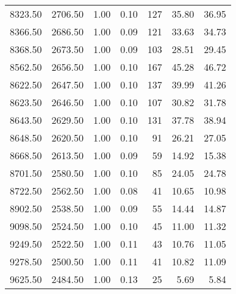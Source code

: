 \begin{table}
\begin{tabular}{rrrrrrr}
8323.50 & 2706.50 & 1.00 & 0.10 & 127 & 35.80 & 36.95 \\
8366.50 & 2686.50 & 1.00 & 0.09 & 121 & 33.63 & 34.73 \\
8368.50 & 2673.50 & 1.00 & 0.09 & 103 & 28.51 & 29.45 \\
8562.50 & 2656.50 & 1.00 & 0.10 & 167 & 45.28 & 46.72 \\
8622.50 & 2647.50 & 1.00 & 0.10 & 137 & 39.99 & 41.26 \\
8623.50 & 2646.50 & 1.00 & 0.10 & 107 & 30.82 & 31.78 \\
8643.50 & 2629.50 & 1.00 & 0.10 & 131 & 37.78 & 38.94 \\
8648.50 & 2620.50 & 1.00 & 0.10 & 91 & 26.21 & 27.05 \\
8668.50 & 2613.50 & 1.00 & 0.09 & 59 & 14.92 & 15.38 \\
8701.50 & 2580.50 & 1.00 & 0.10 & 85 & 24.05 & 24.78 \\
8722.50 & 2562.50 & 1.00 & 0.08 & 41 & 10.65 & 10.98 \\
8902.50 & 2538.50 & 1.00 & 0.09 & 55 & 14.44 & 14.87 \\
9098.50 & 2524.50 & 1.00 & 0.10 & 45 & 11.00 & 11.32 \\
9249.50 & 2522.50 & 1.00 & 0.11 & 43 & 10.76 & 11.05 \\
9278.50 & 2500.50 & 1.00 & 0.11 & 41 & 10.82 & 11.09 \\
9625.50 & 2484.50 & 1.00 & 0.13 & 25 & 5.69 & 5.84 \\
\bottomrule
\end{tabular}
\end{table}
